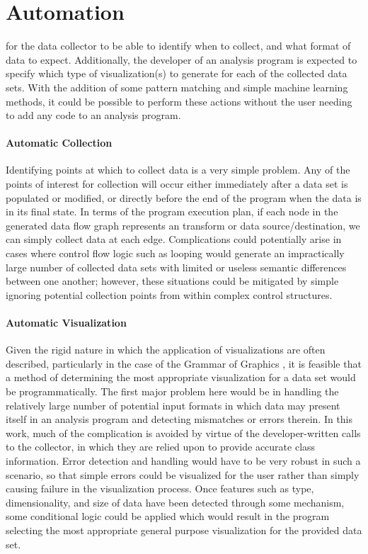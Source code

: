 \section{Automation}
\label{sec:automation}
 for the data collector to be able to identify when to collect, and what format of data to expect. Additionally, the developer of an analysis program is expected to specify which type of visualization(s) to generate for each of the collected data sets. With the addition of some pattern matching and simple machine learning methods, it could be possible to perform these actions without the user needing to add any code to an analysis program.

\paragraph{Automatic Collection}
Identifying points at which to collect data is a very simple problem. Any of the points of interest for collection will occur either immediately after a data set is populated or modified, or directly before the end of the program when the data is in its final state. In terms of the program execution plan, if each node in the generated data flow graph represents an transform or data source/destination, we can simply collect data at each edge. Complications could potentially arise in cases where control flow logic such as looping would generate an impractically large number of collected data sets with limited or useless semantic differences between one another; however, these situations could be mitigated by simple ignoring potential collection points from within complex control structures.

\paragraph{Automatic Visualization}
Given the rigid nature in which the application of visualizations  are often described, particularly in the case of the Grammar of Graphics \cite{Wilkinson2005}, it is feasible that a method of determining the most appropriate visualization for a data set would be programmatically. The first major problem here would be in handling the relatively large number of potential input formats in which data may present itself in an analysis program and detecting mismatches or errors therein. In this work, much of the complication is avoided by virtue of the developer-written calls to the collector, in which they are relied upon to provide accurate class information. Error detection and handling would have to be very robust in such a scenario, so that simple errors could be visualized for the user rather than simply causing failure in the visualization process. Once features such as type, dimensionality, and size of data have been detected through some mechanism, some conditional logic could be applied which would result in the program selecting the most appropriate general purpose visualization for the provided data set.  